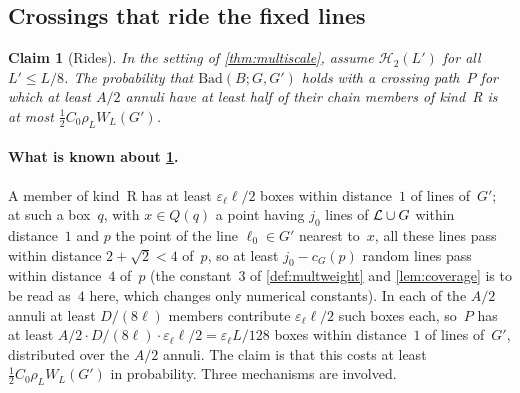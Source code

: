 \documentclass[11pt,letterpaper]{article}
\newcommand{\Bad}{\mathrm{Bad}}
\newtheorem{claim}{Claim}
\newenvironment{boxedclaim}[2]{\renewcommand{\theclaim}{#1}\begin{framed}\begin{claim}[#2]}{\end{claim}\end{framed}}
\begin{document}
\subsection{Crossings that ride the fixed lines}

\begin{boxedclaim}{C2}{Rides}
\label{claim:C2}
In the setting of \cref{thm:multiscale}, assume $\mathcal H_2(L')$ for all $L'\le L/8$. The probability that $\Bad(B;G,G')$ holds with a crossing path~$P$ for which at least $A/2$ annuli have at least half of their chain members of kind~R is at most $\tfrac12C_0\rho_LW_L(G')$.
\end{boxedclaim}

\paragraph{What is known about \cref{claim:C2}.} A member of kind~R has at least $\varepsilon_\ell\ell/2$ boxes within distance~$1$ of lines of~$G'$; at such a box~$q$, with $x\in Q(q)$ a point having $j_0$ lines of $\mathcal L\cup G$ within distance~$1$ and $p$ the point of the line $\ell_0\in G'$ nearest to~$x$, all these lines pass within distance $2+\sqrt2<4$ of~$p$, so at least $j_0-c_G(p)$ random lines pass within distance~$4$ of~$p$ (the constant~$3$ of \cref{def:multweight} and \cref{lem:coverage} is to be read as~$4$ here, which changes only numerical constants). In each of the $A/2$ annuli at least $D/(8\ell)$ members contribute $\varepsilon_\ell\ell/2$ such boxes each, so~$P$ has at least $A/2\cdot D/(8\ell)\cdot\varepsilon_\ell\ell/2=\varepsilon_\ell L/128$ boxes within distance~$1$ of lines of~$G'$, distributed over the $A/2$ annuli. The claim is that this costs at least $\tfrac12C_0\rho_LW_L(G')$ in probability. Three mechanisms are involved.
\end{document}
